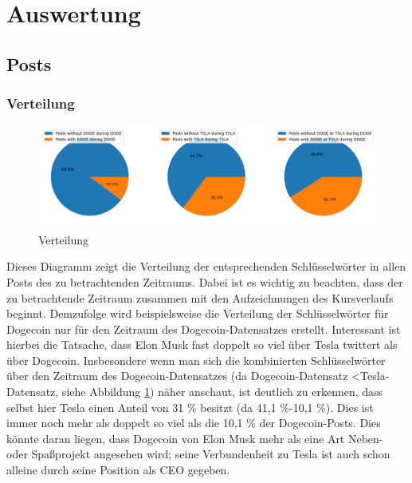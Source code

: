 \documentclass{article}
\begin{document}
\newpage

\section{Auswertung} \label{Auswertung}

\subsection{Posts} \label{Posts}

\subsubsection{Verteilung} \label{Verteilung}
\begin{figure}[h]
  	\centering
  	\includegraphics[width=\textwidth]{../imgs/Verteilung.png}
 	\caption{Verteilung}
 	\label{fig:Verteilung}
\end{figure}
Dieses Diagramm zeigt die Verteilung der entsprechenden Schlüsselwörter in allen Posts des zu betrachtenden Zeitraums.
Dabei ist es wichtig zu beachten, dass der zu betrachtende Zeitraum zusammen mit den Aufzeichnungen des Kursverlaufs beginnt.
Demzufolge wird beispielsweise die Verteilung der Schlüsselwörter für Dogecoin nur für den Zeitraum des Dogecoin-Datensatzes erstellt.
Interessant ist hierbei die Tatsache, dass Elon Musk fast doppelt so viel über Tesla twittert als über Dogecoin.
Insbesondere wenn man sich die kombinierten Schlüsselwörter über den Zeitraum des Dogecoin-Datensatzes (da Dogecoin-Datensatz \textless Tesla-Datensatz, siehe Abbildung \ref{fig:Verteilung}) näher anschaut, ist deutlich zu erkennen, dass selbst hier Tesla einen Anteil von 31 \% besitzt (da 41,1 \%-10,1 \%).
Dies ist immer noch mehr als doppelt so viel als die 10,1 \% der Dogecoin-Posts.
Dies könnte daran liegen, dass Dogecoin von Elon Musk mehr als eine Art Neben- oder Spaßprojekt angesehen wird; seine Verbundenheit zu Tesla ist auch schon alleine durch seine Position als CEO gegeben.
\end{document}
